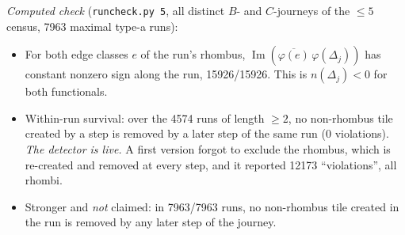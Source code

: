 \documentclass[11pt]{article}
\theoremstyle{definition}\newtheorem{definition}[theorem]{Definition}\newtheorem{remark}[theorem]{Remark}
\begin{document}
\noindent\emph{Computed check} (\texttt{runcheck.py 5}, all distinct $B$- and $C$-journeys of the $\le5$ census, 7963 maximal type-a runs):
\begin{itemize}
\item[(a)] For both edge classes $e$ of the run's rhombus, $\operatorname{Im}(\overline{\varphi(e)}\,\varphi(\Delta_j))$ has constant nonzero sign along the run, 15926/15926. This is $n(\Delta_j)<0$ for both functionals.
\item[(b)] Within-run survival: over the 4574 runs of length $\ge2$, no non-rhombus tile created by a step is removed by a later step of the same run (0 violations).
\emph{The detector is live.} A first version forgot to exclude the rhombus, which is re-created and removed at every step, and it reported 12173 ``violations'', all rhombi.
\item[(c)] Stronger and \emph{not} claimed: in 7963/7963 runs, no non-rhombus tile created in the run is removed by any later step of the journey.
\end{itemize}
\end{document}
